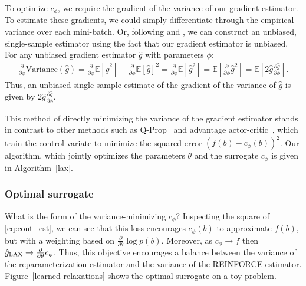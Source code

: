 \documentclass{article}
\newcommand{\E}{\mathbb{E}}
\newcommand{\PT}{\frac{\partial}{\partial \theta}}
\newcommand{\PPH}{\frac{\partial}{\partial \phi}}
\newcommand{\LAX}{{\textnormal{LAX}}}
\begin{document}
To optimize $c_\phi$, we require the gradient of the variance of our gradient estimator.
To estimate these gradients, we could simply differentiate through the empirical variance over each mini-batch.
Or, following \cite{tucker2017rebar} and \cite{ruiz2016overdispersed}, we can construct an unbiased, single-sample estimator using the fact that our gradient estimator is unbiased.
For any unbiased gradient estimator $\hat g$ with parameters $\phi$:
%
\begin{align}
\PPH \text{Variance}(\hat g)
= \PPH \E[\hat g^2] - \PPH \E[\hat g]^2
= \PPH \E[\hat g^2]
= \E \left[ \PPH \hat g^2 \right]
= \E \left[ 2 \hat g \frac{\partial \hat g}{\partial \phi} \right].
\label{eq:vargrad}
\end{align}  %
%
Thus, an unbiased single-sample estimate of the gradient of the variance of $\hat g$ is given by {$2 \hat g \frac{\partial \hat g}{\partial \phi}$}.

This method of directly minimizing the variance of the gradient estimator stands in contrast to other methods such as Q-Prop~\citep{gu2016q} and advantage actor-critic~\citep{mnih2016asynchronous}, which train the control variate to minimize the squared error $(f(b) - c_\phi(b))^2$.
Our algorithm, which jointly optimizes the parameters $\theta$ and the surrogate $c_\phi$ is given in Algorithm~\ref{lax}.

\subsubsection{Optimal surrogate}
What is the form of the variance-minimizing $c_\phi$?
Inspecting the square of \eqref{eq:cont_est}, we can see that this loss encourages $c_\phi(b)$ to approximate $f(b)$, but with a weighting based on $\PT\log p(b)$.  %
Moreover, as $c_\phi \rightarrow f$ then $\hat g_\textnormal{\LAX} \rightarrow \PT c_\phi$.
Thus, this objective encourages a balance between the variance of the reparameterization estimator and the variance of the REINFORCE estimator.
Figure~\ref{learned-relaxations} shows the optimal surrogate on a toy problem.
\end{document}
